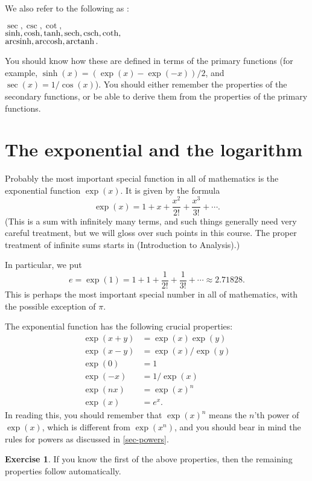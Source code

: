 \documentclass[a4paper]{book}
\theoremstyle{definition}
\newtheorem{exercise}[theorem]{Exercise}
\begin{document}
We also refer to the following as :
\begin{center}
  $\sec, \csc, \cot,$\\
  $\sinh, \cosh, \tanh, \operatorname{sech}, \operatorname{csch}, \coth,$ \\
  $\operatorname{arcsinh}, \operatorname{arccosh}, \operatorname{arctanh}.$
\end{center}
You should know how these are defined in terms of the primary
functions (for example, $\sinh(x)=(\exp(x)-\exp(-x))/2$, and
$\sec(x)=1/\cos(x)$).  You should either remember the properties of
the secondary functions, or be able to derive them from the properties
of the primary functions.

\section{The exponential and the logarithm}
\label{sec-explog}

Probably the most important special function in all of mathematics is
the exponential function $\exp(x)$.  It is given by the formula
\[ \exp(x) = 1 + x + \frac{x^2}{2!} + \frac{x^3}{3!} + \cdots. \]
(This is a sum with infinitely many terms, and such things generally
need very careful treatment, but we will gloss over such points
in this course.  The proper treatment of infinite sums starts in
 (Introduction to Analysis).)

In particular, we put
\[ e = \exp(1) = 1 + 1 + \frac{1}{2!} + \frac{1}{3!} + \cdots
    \approx 2.71828.
\]
This is perhaps the most important special number in all of
mathematics, with the possible exception of $\pi$.

The exponential function has the following crucial properties:
\begin{align*}
 \exp(x+y) &= \exp(x) \exp(y) \\
 \exp(x-y) &= \exp(x)/\exp(y) \\
 \exp(0)   &= 1 \\
 \exp(-x)  &= 1/\exp(x) \\
 \exp(nx)  &= \exp(x)^n \\
 \exp(x)   &= e^x.
\end{align*}
In reading this, you should remember that $\exp(x)^n$ means
the $n$'th power of $\exp(x)$, which is different from $\exp(x^n)$,
and you should bear in mind the rules for powers as discussed in
\autoref{sec-powers}.  
\begin{exercise}
 If you know the first of the above properties, then the remaining
 properties follow automatically.
\end{exercise}
\end{document}
